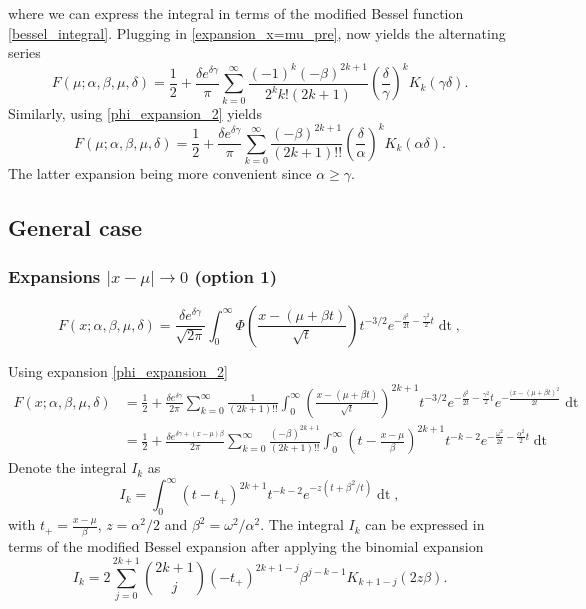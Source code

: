 \documentclass[10pt,a4paper,oneside]{article}
\numberwithin{equation}{section}
\begin{document}
where we can express the integral in terms of the modified Bessel function \eqref{bessel_integral}. Plugging in \eqref{expansion_x=mu_pre}, now yields the alternating series
\begin{equation}\label{series_x=mu_1}
F(\mu; \alpha, \beta, \mu, \delta) = \frac{1}{2} + \frac{\delta e^{\delta \gamma}}{\pi} \sum_{k=0}^{\infty} \frac{(-1)^k (-\beta)^{2k+1}}{2^k k! (2k + 1)} \left(\frac{\delta}{\gamma}\right)^k K_k(\gamma \delta).
\end{equation}
Similarly, using \eqref{phi_expansion_2} yields
\begin{equation}\label{series_x=mu_2}
F(\mu; \alpha, \beta, \mu, \delta) = \frac{1}{2} + \frac{\delta e^{\delta \gamma}}{\pi} \sum_{k=0}^{\infty} \frac{(-\beta)^{2k+1}}{(2k + 1)!!} \left(\frac{\delta}{\alpha}\right)^k K_k(\alpha \delta).
\end{equation}
The latter expansion being more convenient since $\alpha \ge \gamma$.



\subsection{General case}\label{section_general_case}
\subsubsection{Expansions $|x-\mu| \to 0$ (option 1)}
\begin{equation*}
F(x;\alpha, \beta, \mu, \delta) = \frac{\delta e^{\delta \gamma}}{\sqrt{2\pi}} \int_{0}^{\infty} \Phi\left(\frac{x - (\mu +\beta t)}{\sqrt{t}}\right) t^{-3/2} e^{-\frac{\delta^2}{2t} - \frac{\gamma^2}{2}t} \mathop{dt},
\end{equation*}

Using expansion \eqref{phi_expansion_2}
\begin{align}
F(x;\alpha, \beta, \mu, \delta) &= \frac{1}{2} + \frac{\delta e^{\delta \gamma}}{2\pi} \sum_{k=0}^{\infty} \frac{1}{(2k + 1)!!}\int_0^{\infty} \left(\frac{x - (\mu +\beta t)}{\sqrt{t}}\right)^{2k+1} t^{-3/2} e^{-\frac{\delta^2}{2t} - \frac{\gamma^2}{2}t} e^{- \frac{(x-(\mu + \beta t)^2}{2t}} \mathop{dt} \nonumber\\
&=\frac{1}{2} + \frac{\delta e^{\delta \gamma + (x -\mu)\beta}}{2\pi}\sum_{k=0}^{\infty} \frac{(-\beta)^{2k+1}}{(2k + 1)!!}\int_0^{\infty} \left(t - \frac{x-\mu}{\beta}\right)^{2k+1} t^{-k-2} e^{-\frac{\omega^2}{2t} - \frac{\alpha^2}{2}t} \mathop{dt}
\end{align}
Denote the integral $I_k$ as
\begin{equation}
I_k = \int_0^{\infty} (t- t_+)^{2k+1} t^{-k-2} e^{-z(t + \beta^2/t)} \mathop{dt},
\end{equation}
with $t_+ = \frac{x-\mu}{\beta}$, $z = \alpha^2 / 2$ and $\beta^2 = \omega^2 /  \alpha^2$. The integral $I_k$ can be expressed in terms of the modified Bessel expansion after applying the binomial expansion
\begin{equation}
I_k = 2\sum_{j=0}^{2k + 1}\binom{2k+1}{j} (-t_+)^{2k+1-j} \beta^{j-k-1} K_{k+1-j}(2z\beta).
\end{equation}
\end{document}
